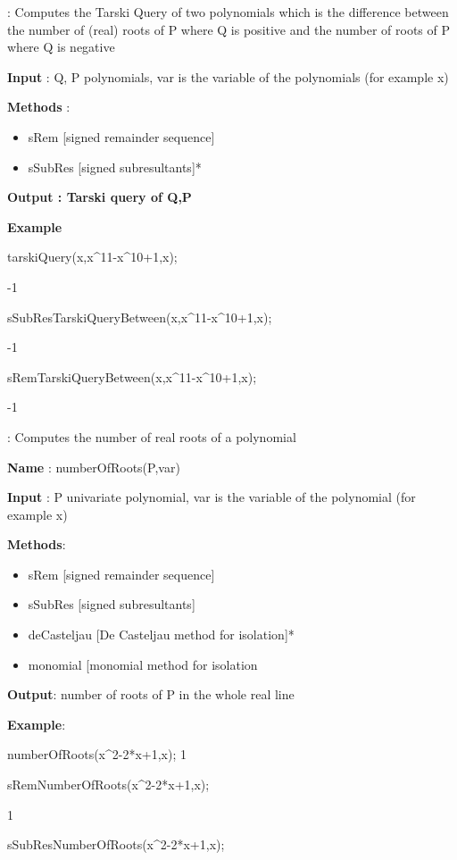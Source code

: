 \documentclass{article}
\begin{document}
:
  Computes the Tarski Query of two polynomials which is the difference between
  the number of (real) roots of P where Q is positive and the number of roots
  of P where Q is negative

  {\bf Input} : Q, P polynomials, var is the variable of the polynomials (for example x)
  
  {\bf Methods} :
  \begin{itemize}
    \item sRem [signed remainder sequence]
    \item sSubRes [signed subresultants]*
  \end{itemize}
  
  {\bf Output : Tarski query of Q,P}

 {\bf Example}{
 
 tarskiQuery(x,x\^{}11-x\^{}10+1,x);
 
  -1
  
sSubResTarskiQueryBetween(x,x\^{}11-x\^{}10+1,x);

-1

sRemTarskiQueryBetween(x,x\^{}11-x\^{}10+1,x);

 -1
  
:
  Computes the number of real roots of a polynomial
  
 {\bf Name} : numberOfRoots(P,var)
 
 {\bf Input }: P univariate polynomial, var is the variable of the polynomial (for example x)
  
  {\bf Methods}:
  \begin{itemize}
    \item sRem [signed remainder sequence]
    \item sSubRes [signed subresultants]
    \item deCasteljau [De Casteljau method for isolation]*
    \item {\color{grey} monomial [monomial method for isolation}
  \end{itemize}
  
 {\bf Output}: number of roots of P in the whole real line
  
{\bf Example}:

   numberOfRoots(x\^{}2-2*x+1,x);
1
  
  sRemNumberOfRoots(x\^{}2-2*x+1,x);
  
1

 
 sSubResNumberOfRoots(x\^{}2-2*x+1,x);
 
}
\end{document}
